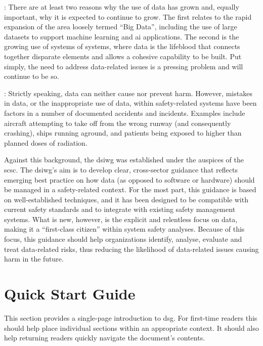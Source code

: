 : There are at least two reasons why the use of data has grown and, equally important, why it is expected to continue to grow. The  first relates to the rapid expansion of the area loosely termed ``Big Data'', including the use of large \glspl{dataset} to support machine learning and \gls{ai} applications. The second is the growing use of systems of systems, where data is the lifeblood that connects together disparate elements and allows a cohesive capability to be built. Put simply, the need to address data-related issues is a pressing problem and will continue to be so.

: Strictly speaking,
data can neither cause nor prevent harm.
However, mistakes in data, or the inappropriate use of data, within safety-related systems have been factors in a number of documented accidents and incidents. Examples include aircraft attempting to take off from the wrong runway (and consequently crashing), ships running aground, and patients being exposed to higher than planned doses of radiation.

Against this background, the \gls{dsiwg} was established under the auspices of the \gls{scsc}. The \gls{dsiwg}'s aim is to develop clear, cross-sector guidance that reflects emerging best practice on how data (as opposed to software or hardware) should be managed in a safety-related context.
For the most part, this guidance is based on well-established techniques,
and it has been designed to be compatible with current safety standards and to integrate with existing safety management systems.
What is new, however, is the explicit and relentless focus on data, making it a ``first-class citizen'' within system safety analyses.
Because of this focus, this guidance should help organizations identify, analyse, evaluate and treat data-related risks, thus reducing the likelihood of data-related issues causing harm in the future.

\clearpage
\section*{Quick Start Guide}
\pagestyle{ContinuationPageFrontMatter}


This section provides a single-page introduction to \gls{dsg}. For first-time readers this should help place individual sections within an appropriate context. It should also help returning readers quickly navigate the document's contents.

